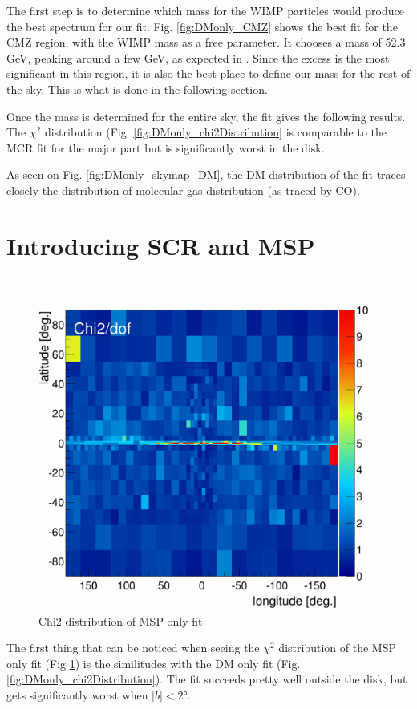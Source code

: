 The first step is to determine which mass for the WIMP particles would produce the best spectrum for our fit. Fig. \ref{fig:DMonly_CMZ} shows the best fit for the CMZ region, with the WIMP mass as a free parameter. It chooses a mass of 52.3 GeV, peaking around a few GeV, as expected in . Since the excess is the most significant in this region, it is also the best place to define our mass for the rest of the sky. This is what is done in the following section.


Once the mass is determined for the entire sky, the fit gives the following results. The $\chi^2$ distribution (Fig. \ref{fig:DMonly_chi2Distribution} is comparable to the MCR fit for the major part but is significantly worst in the disk.


As seen on Fig. \ref{fig:DMonly_skymap_DM}, the DM distribution of the fit traces closely the distribution of molecular gas distribution (as traced by CO).



\section{Introducing SCR and MSP}

\begin{figure}[h]
  \centering
  \includegraphics[width=.5\linewidth]{pic/results/MSPonly_chi2Distribution.png}
  \caption{Chi2 distribution of MSP only fit}
  \label{fig:MSPonly_chi2Distribution}
\end{figure}

The first thing that can be noticed when seeing the $\chi^2$ distribution of the MSP only fit (Fig \ref{fig:MSPonly_chi2Distribution}) is the similitudes with the DM only fit (Fig. \ref{fig:DMonly_chi2Distribution}). The fit succeeds pretty well outside the disk, but gets significantly worst when $|b| < 2°$.

